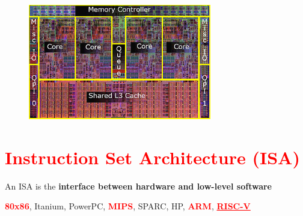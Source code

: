 \documentclass[
  16pt,
  a4paper,
]{report}
\begin{document}
\begin{figure}[H]
\begin{minipage}{0.50\linewidth}
\end{minipage}%
%
\begin{minipage}{0.50\linewidth}
\includegraphics[width=8cm,height=\textheight]{lecture1-3/images/corei7diagram.png}\end{minipage}%

\end{figure}%

\chapter{\texorpdfstring{\textcolor{red}{Instruction Set Architecture
(ISA)}}{Instruction Set Architecture (ISA)}}\label{instruction-set-architecture-isa}

An ISA is the \textbf{interface between hardware and low-level software}

\begin{tcolorbox}[colback=boxbodycol, colframe=boxheadcol, title=Some modern instruction set architectures:, coltitle=boxtitlecol, colbacktitle=boxheadcol]
\textcolor{red}{\textbf{80x86}}, Itanium, PowerPC,
\textcolor{red}{\textbf{MIPS}}, SPARC, HP,
\textcolor{red}{\textbf{ARM}},
\textcolor{red}{\textbf{\underline{RISC-V}}}

\end{tcolorbox}
\end{document}

